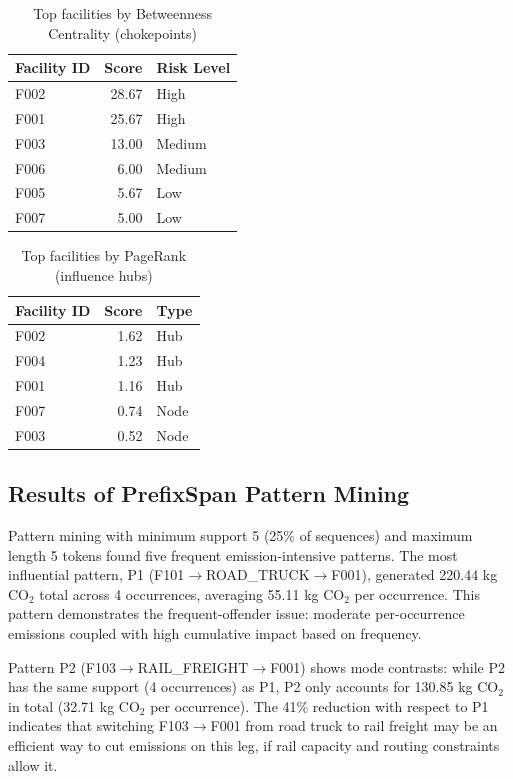 \documentclass[conference]{IEEEtran}
\begin{document}
\begin{table}[!t]
\centering
\caption{Top facilities by Betweenness Centrality (chokepoints)}
\small
\begin{tabular}{@{}lrl@{}}
\toprule
\textbf{Facility ID} & \textbf{Score} & \textbf{Risk Level} \\
\midrule
F002 & 28.67 & High \\
F001 & 25.67 & High \\
F003 & 13.00 & Medium \\
F006 & 6.00 & Medium \\
F005 & 5.67 & Low \\
F007 & 5.00 & Low \\
\bottomrule
\end{tabular}
\label{tab:betweenness}
\end{table}

\begin{table}[!t]
\centering
\caption{Top facilities by PageRank (influence hubs)}
\small
\begin{tabular}{@{}lrl@{}}
\toprule
\textbf{Facility ID} & \textbf{Score} & \textbf{Type} \\
\midrule
F002 & 1.62 & Hub \\
F004 & 1.23 & Hub \\
F001 & 1.16 & Hub \\
F007 & 0.74 & Node \\
F003 & 0.52 & Node \\
\bottomrule
\end{tabular}
\label{tab:pagerank}
\end{table}

\subsection{Results of PrefixSpan Pattern Mining}
Pattern mining with minimum support 5 (25\% of sequences) and maximum length 5 tokens found five frequent emission-intensive patterns. The most influential pattern, P1 (F101$\to$ROAD\_TRUCK$\to$F001), generated 220.44 kg CO$_2$ total across 4 occurrences, averaging 55.11 kg CO$_2$ per occurrence. This pattern demonstrates the frequent-offender issue: moderate per-occurrence emissions coupled with high cumulative impact based on frequency.

Pattern P2 (F103$\to$RAIL\_FREIGHT$\to$F001) shows mode contrasts: while P2 has the same support (4 occurrences) as P1, P2 only accounts for 130.85 kg CO$_2$ in total (32.71 kg CO$_2$ per occurrence). The 41\% reduction with respect to P1 indicates that switching F103$\to$F001 from road truck to rail freight may be an efficient way to cut emissions on this leg, if rail capacity and routing constraints allow it.
\end{document}
